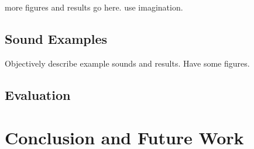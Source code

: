 \documentclass{acmsiggraph}               %
\begin{document}
more figures and results go here.  use imagination.

\subsection{Sound Examples}
Objectively describe example sounds and results. Have some figures. 

\subsection{Evaluation}





\section{Conclusion and Future Work}
\end{document}
